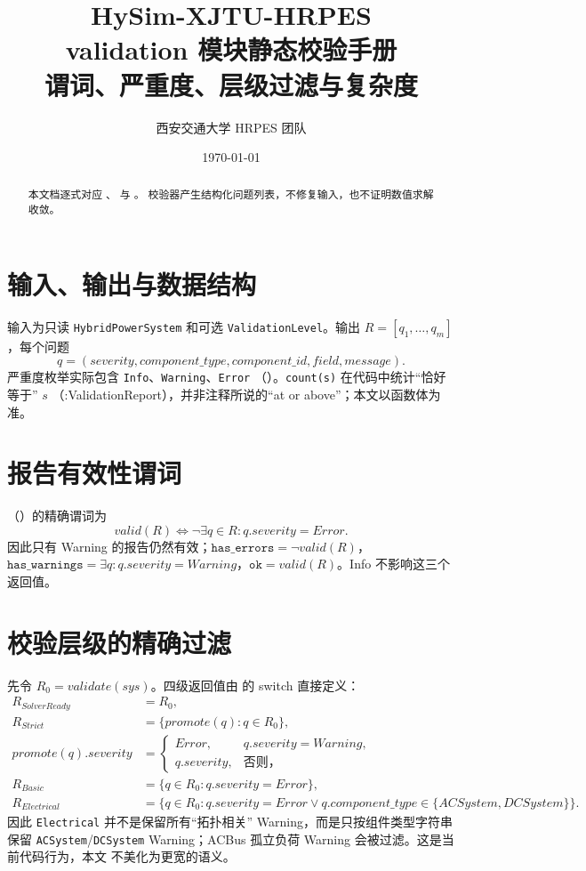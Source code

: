 \documentclass[UTF8,fontset=fandol,a4paper,11pt]{ctexart}
\title{\textbf{HySim-XJTU-HRPES}\\[0.4em]{\Large validation 模块静态校验手册}\\
{\large 谓词、严重度、层级过滤与复杂度}}
\author{西安交通大学 HRPES 团队}
\date{\today}
\begin{document}
\maketitle
\begin{abstract}
本文档逐式对应 、
 与 。
校验器产生结构化问题列表，不修复输入，也不证明数值求解收敛。
\end{abstract}
\tableofcontents

\section{输入、输出与数据结构}
输入为只读 \texttt{HybridPowerSystem} 和可选 \texttt{ValidationLevel}。输出
$R=[q_1,\ldots,q_m]$，每个问题
\begin{equation}
q=(severity,component\_type,component\_id,field,message).
\end{equation}
严重度枚举实际包含 \texttt{Info}、\texttt{Warning}、\texttt{Error}
（）。\texttt{count(s)} 在代码中统计“恰好等于” $s$
（:ValidationReport），并非注释所说的“at or above”；本文以函数体为准。

\section{报告有效性谓词}
（）的精确谓词为
\begin{equation}
valid(R)\Longleftrightarrow\neg\exists q\in R:q.severity=Error.
\end{equation}
因此只有 Warning 的报告仍然有效；$\texttt{has\_errors}=\neg valid(R)$，
$\texttt{has\_warnings}=\exists q:q.severity=Warning$，$\texttt{ok}=valid(R)$。Info 不影响这三个返回值。

\section{校验层级的精确过滤}
先令 $R_0=validate(sys)$。四级返回值由
 的 switch 直接定义：
\begin{align}
R_{SolverReady}&=R_0,\\
R_{Strict}&=\{promote(q):q\in R_0\},\\
promote(q).severity&=\begin{cases}Error,&q.severity=Warning,\\q.severity,&\text{否则，}\end{cases}\\
R_{Basic}&=\{q\in R_0:q.severity=Error\},\\
R_{Electrical}&=\{q\in R_0:q.severity=Error\lor
q.component\_type\in\{ACSystem,DCSystem\}\}.
\end{align}
因此 \texttt{Electrical} 并不是保留所有“拓扑相关” Warning，而是只按组件类型字符串保留
\texttt{ACSystem}/\texttt{DCSystem} Warning；ACBus 孤立负荷 Warning 会被过滤。这是当前代码行为，本文
不美化为更宽的语义。
\end{document}
